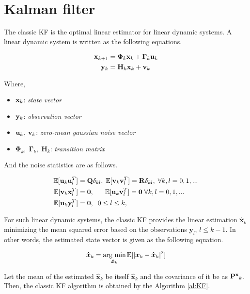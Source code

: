 \section{Kalman filter\label{sec: kf}}

The classic KF is the optimal linear estimator for linear dynamic systems. A linear dynamic system is written as the following equations.

\begin{align}
{\bf x}_{k+1} &= \bm{\Phi}_k{\bf x}_{k} + \bm{\Gamma}_k{\bf u}_{k} \label{eq:linear1}\\
{\bf y}_{k} &= {\bf H}_k{\bf x}_{k} + {\bf v}_{k} \label{eq:linear2}
\end{align}

Where, 
\begin{itemize}
    \item ${\bf x}_k$: {\it state vector}
    \item ${\bf y}_k$: {\it observation vector}
    \item ${\bf u}_k$, ${\bf v}_k$: {\it zero-mean gaussian noise vector}
    \item $\bm{\Phi}_k, \; \bm{\Gamma}_k, \; \bm{H}_k$: {\it transition matrix}
\end{itemize}

And the noise statistics are as follows.

\begin{align}
    \mathbb{E}[{\bf u}_k{\bf u}_l^T]&={\bf Q}\delta_{kl},\;
    \mathbb{E}[{\bf v}_k{\bf v}_l^T]={\bf R}\delta_{kl},\; \forall k,l=0,1,...\\
    \mathbb{E}[{\bf v}_k{\bf x}_l^T]&={\bf 0},\;\;\;\;\;\;
    \mathbb{E}[{\bf u}_k{\bf v}_l^T]={\bf 0}\; \forall k,l=0,1,...\\
    \mathbb{E}[{\bf u}_k{\bf y}_l^T]&={\bf 0}, \;\; 0\leq l\leq k,
\end{align}

For such linear dynamic systems, the classic KF provides the linear estimation $\bm{\hat x}_k$ minimizing the mean squared error based on the observations $\bm{y}_l$, $l\leq k-1$. In other words, the estimated state vector is given as the following equation.

\begin{equation} \label{eq:cost}
    \bm{\hat x}_k = \mathop{\rm arg~min}\limits_{\bm{\hat x}_k}\mathbb{E}[|\bm{x}_k-\bm{\hat x}_k|^2]
\end{equation}

Let the mean of the estimated $\bm{\hat x}_k$ be itself $\bm{\hat x}_k$ and the covariance of it be as ${\bf P^x}_{k}$. Then, the classic KF algorithm is obtained by the Algorithm \ref{al:KF}.


